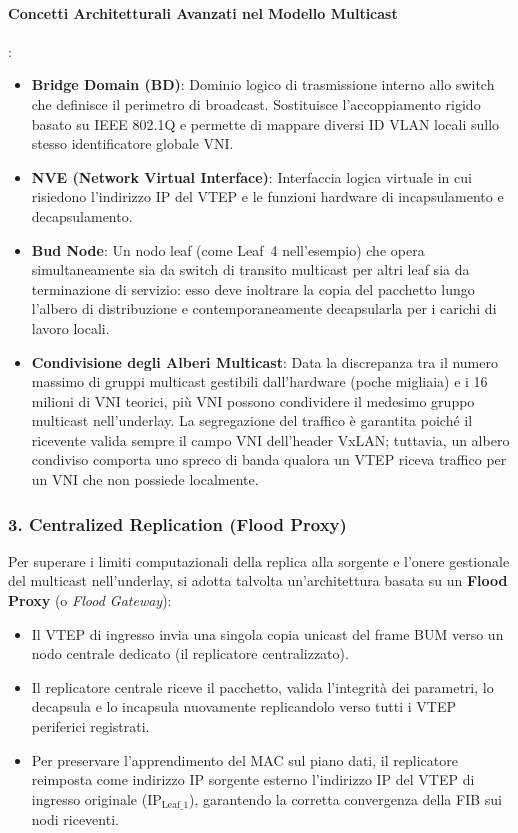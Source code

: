 \documentclass[11pt, a4paper]{article}
\begin{document}
\paragraph{Concetti Architetturali Avanzati nel Modello Multicast}:
\begin{itemize}
    \item \textbf{Bridge Domain (BD)}: Dominio logico di trasmissione interno allo switch che definisce il perimetro di broadcast. Sostituisce l'accoppiamento rigido basato su IEEE 802.1Q e permette di mappare diversi ID VLAN locali sullo stesso identificatore globale VNI.
    \item \textbf{NVE (Network Virtual Interface)}: Interfaccia logica virtuale in cui risiedono l'indirizzo IP del VTEP e le funzioni hardware di incapsulamento e decapsulamento.
    \item \textbf{Bud Node}: Un nodo leaf (come Leaf~4 nell'esempio) che opera simultaneamente sia da switch di transito multicast per altri leaf sia da terminazione di servizio: esso deve inoltrare la copia del pacchetto lungo l'albero di distribuzione e contemporaneamente decapsularla per i carichi di lavoro locali.
    \item \textbf{Condivisione degli Alberi Multicast}: Data la discrepanza tra il numero massimo di gruppi multicast gestibili dall'hardware (poche migliaia) e i 16 milioni di VNI teorici, più VNI possono condividere il medesimo gruppo multicast nell'underlay. La segregazione del traffico è garantita poiché il ricevente valida sempre il campo VNI dell'header VxLAN; tuttavia, un albero condiviso comporta uno spreco di banda qualora un VTEP riceva traffico per un VNI che non possiede localmente.
\end{itemize}

\subsubsection{3. Centralized Replication (Flood Proxy)}
Per superare i limiti computazionali della replica alla sorgente e l'onere gestionale del multicast nell'underlay, si adotta talvolta un'architettura basata su un \textbf{Flood Proxy} (o \emph{Flood Gateway}):
\begin{itemize}
    \item Il VTEP di ingresso invia una singola copia unicast del frame BUM verso un nodo centrale dedicato (il replicatore centralizzato).
    \item Il replicatore centrale riceve il pacchetto, valida l'integrità dei parametri, lo decapsula e lo incapsula nuovamente replicandolo verso tutti i VTEP periferici registrati.
    \item Per preservare l'apprendimento del MAC sul piano dati, il replicatore reimposta come indirizzo IP sorgente esterno l'indirizzo IP del VTEP di ingresso originale ($\text{IP}_{\text{Leaf\_1}}$), garantendo la corretta convergenza della FIB sui nodi riceventi.
\end{itemize}
\end{document}

